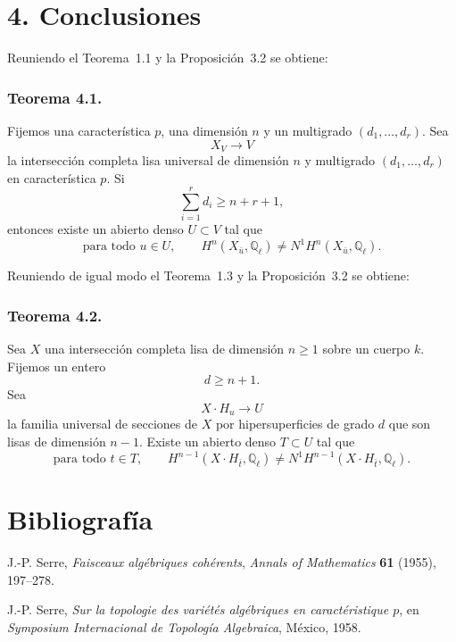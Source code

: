 \section*{4. Conclusiones}

Reuniendo el Teorema~1.1 y la Proposición~3.2 se obtiene:

\subsubsection*{Teorema 4.1.}
Fijemos una característica $p$, una dimensión $n$ y un multigrado
$(d_1,\ldots,d_r)$. Sea
\begin{equation}\tag{4.1.0}
X_V\longrightarrow V
\end{equation}
la intersección completa lisa universal de dimensión $n$ y multigrado
$(d_1,\ldots,d_r)$ en característica $p$. Si
\begin{equation}\tag{4.1.1}
\sum_{i=1}^{r}d_i\geq n+r+1,
\end{equation}
entonces existe un abierto denso $U\subset V$ tal que
\begin{equation}\tag{4.1.2}
\text{para todo }u\in U,\qquad
H^n(X_{\bar u},\mathbb Q_\ell)\ne N^1H^n(X_{\bar u},\mathbb Q_\ell).
\end{equation}

Reuniendo de igual modo el Teorema~1.3 y la Proposición~3.2 se obtiene:

\pageoriginale

\subsubsection*{Teorema 4.2.}
Sea $X$ una intersección completa lisa de dimensión $n\geq1$ sobre un
cuerpo $k$. Fijemos un entero
\begin{equation}\tag{4.2.1}
d\geq n+1.
\end{equation}
Sea
\begin{equation}\tag{4.2.2}
X\mathbin{\cdot}H_u\longrightarrow U
\end{equation}
la familia universal de secciones de $X$ por hipersuperficies de grado
$d$ que son lisas de dimensión $n-1$. Existe un abierto denso $T\subset U$
tal que
\begin{equation}\tag{4.2.3}
\text{para todo }t\in T,\qquad
H^{n-1}(X\mathbin{\cdot}H_{\bar t},\mathbb Q_\ell)
\ne N^1H^{n-1}(X\mathbin{\cdot}H_{\bar t},\mathbb Q_\ell).
\end{equation}

\section*{Bibliografía}
\begin{enumerate}[label={\textup{[\arabic*]}},leftmargin=2.6em]
\item J.-P. Serre, \emph{Faisceaux algébriques cohérents},
  \emph{Annals of Mathematics} \textbf{61} (1955), 197--278.
\item J.-P. Serre, \emph{Sur la topologie des variétés algébriques en
  caractéristique $p$}, en \emph{Symposium Internacional de Topología
  Algebraica}, México, 1958.
\end{enumerate}


